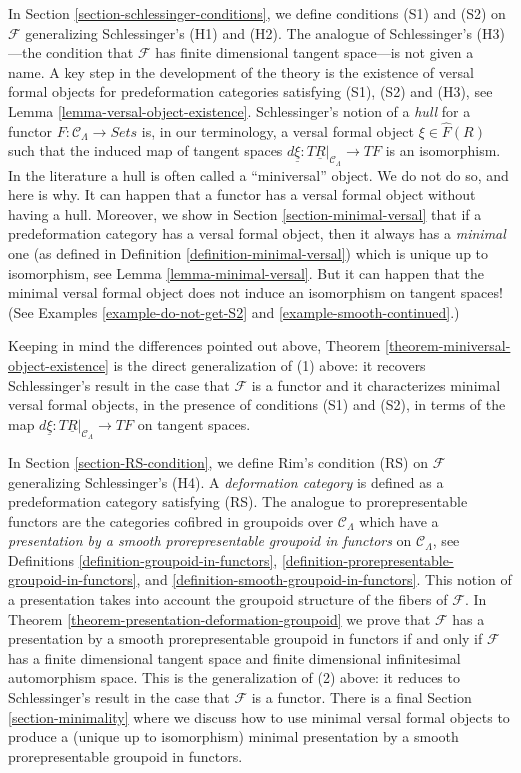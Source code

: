 \documentclass{stacks-project}
\theoremstyle{plain}
\theoremstyle{definition}
\theoremstyle{remark}
\numberwithin{equation}{subsection}
\begin{document}
\medskip\noindent
In
Section \ref{section-schlessinger-conditions},
we define conditions (S1) and (S2) on $\mathcal{F}$ generalizing
Schlessinger's (H1) and (H2). The analogue of Schlessinger's
(H3)---the condition that $\mathcal{F}$ has finite dimensional
tangent space---is not given a name.
A key step in the development of the theory is the existence of
versal formal objects for predeformation categories satisfying
(S1), (S2) and (H3), see
Lemma \ref{lemma-versal-object-existence}.
Schlessinger's notion of a {\it hull} for a functor
$F : \mathcal{C}_\Lambda \to \textit{Sets}$
is, in our terminology, a versal formal object $\xi \in \widehat{F}(R)$
such that the induced map of tangent spaces
$d\underline{\xi} : T\underline{R}|_{\mathcal{C}_\Lambda} \to TF$
is an isomorphism.
In the literature a hull is often called a ``miniversal'' object.
We do not do so, and here is why. It can happen that a functor has a
versal formal object without having a hull. Moreover, we show in
Section \ref{section-minimal-versal}
that if a predeformation category has a versal formal object, then
it always has a {\it minimal} one (as defined in
Definition \ref{definition-minimal-versal})
which is unique up to isomorphism, see
Lemma \ref{lemma-minimal-versal}.
But it can happen that the minimal versal formal object does not
induce an isomorphism on tangent spaces! (See
Examples \ref{example-do-not-get-S2} and
\ref{example-smooth-continued}.)

\medskip\noindent
Keeping in mind the differences pointed out above,
Theorem \ref{theorem-miniversal-object-existence}
is the direct generalization of (1) above: it recovers Schlessinger's
result in the case that $\mathcal{F}$ is a functor and it characterizes
minimal versal formal objects, in the presence of conditions
(S1) and (S2), in terms of the map
$d\underline{\xi} : T\underline{R}|_{\mathcal{C}_\Lambda} \to TF$
on tangent spaces.

\medskip\noindent
In Section \ref{section-RS-condition},
we define Rim's condition (RS) on $\mathcal{F}$ generalizing
Schlessinger's (H4). A {\it deformation category} is defined as a
predeformation category satisfying (RS).
The analogue to prorepresentable functors are the categories
cofibred in groupoids over $\mathcal{C}_\Lambda$ which have
a {\it presentation by a smooth prorepresentable groupoid in functors}
on $\mathcal{C}_\Lambda$, see
Definitions \ref{definition-groupoid-in-functors},
\ref{definition-prorepresentable-groupoid-in-functors}, and
\ref{definition-smooth-groupoid-in-functors}.
This notion of a presentation takes into account the groupoid structure
of the fibers of $\mathcal{F}$. In
Theorem \ref{theorem-presentation-deformation-groupoid}
we prove that $\mathcal{F}$ has a presentation by a smooth prorepresentable
groupoid in functors if and only if $\mathcal{F}$ has a finite dimensional
tangent space and finite dimensional infinitesimal automorphism space.
This is the generalization of (2) above: it reduces to Schlessinger's result
in the case that $\mathcal{F}$ is a functor.
There is a final
Section \ref{section-minimality}
where we discuss how to use minimal versal formal objects
to produce a (unique up to isomorphism) minimal presentation
by a smooth prorepresentable groupoid in functors.
\end{document}
